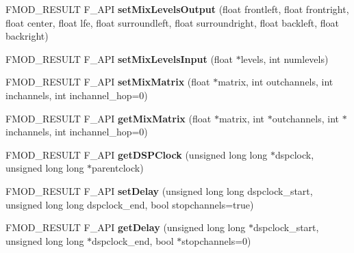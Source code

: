 \begin{DoxyCompactItemize}
\item 
\hypertarget{class_f_m_o_d_1_1_channel_control_a8115b7a7663c09a7ba61df05447415c3}{F\+M\+O\+D\+\_\+\+R\+E\+S\+U\+L\+T F\+\_\+\+A\+P\+I {\bfseries set\+Mix\+Levels\+Output} (float frontleft, float frontright, float center, float lfe, float surroundleft, float surroundright, float backleft, float backright)}\label{class_f_m_o_d_1_1_channel_control_a8115b7a7663c09a7ba61df05447415c3}

\item 
\hypertarget{class_f_m_o_d_1_1_channel_control_a571656bedf6f122615436666005accae}{F\+M\+O\+D\+\_\+\+R\+E\+S\+U\+L\+T F\+\_\+\+A\+P\+I {\bfseries set\+Mix\+Levels\+Input} (float $\ast$levels, int numlevels)}\label{class_f_m_o_d_1_1_channel_control_a571656bedf6f122615436666005accae}

\item 
\hypertarget{class_f_m_o_d_1_1_channel_control_aa88ea962affd54cda96e37fd3a7e2f5a}{F\+M\+O\+D\+\_\+\+R\+E\+S\+U\+L\+T F\+\_\+\+A\+P\+I {\bfseries set\+Mix\+Matrix} (float $\ast$matrix, int outchannels, int inchannels, int inchannel\+\_\+hop=0)}\label{class_f_m_o_d_1_1_channel_control_aa88ea962affd54cda96e37fd3a7e2f5a}

\item 
\hypertarget{class_f_m_o_d_1_1_channel_control_ab24ab6339a35f3028f4fb6e6fd5c134f}{F\+M\+O\+D\+\_\+\+R\+E\+S\+U\+L\+T F\+\_\+\+A\+P\+I {\bfseries get\+Mix\+Matrix} (float $\ast$matrix, int $\ast$outchannels, int $\ast$inchannels, int inchannel\+\_\+hop=0)}\label{class_f_m_o_d_1_1_channel_control_ab24ab6339a35f3028f4fb6e6fd5c134f}

\item 
\hypertarget{class_f_m_o_d_1_1_channel_control_abcfbd62a35db285c30e02299469777fc}{F\+M\+O\+D\+\_\+\+R\+E\+S\+U\+L\+T F\+\_\+\+A\+P\+I {\bfseries get\+D\+S\+P\+Clock} (unsigned long long $\ast$dspclock, unsigned long long $\ast$parentclock)}\label{class_f_m_o_d_1_1_channel_control_abcfbd62a35db285c30e02299469777fc}

\item 
\hypertarget{class_f_m_o_d_1_1_channel_control_a7775d96c75cc964c994fd2e47c96bebc}{F\+M\+O\+D\+\_\+\+R\+E\+S\+U\+L\+T F\+\_\+\+A\+P\+I {\bfseries set\+Delay} (unsigned long long dspclock\+\_\+start, unsigned long long dspclock\+\_\+end, bool stopchannels=true)}\label{class_f_m_o_d_1_1_channel_control_a7775d96c75cc964c994fd2e47c96bebc}

\item 
\hypertarget{class_f_m_o_d_1_1_channel_control_aea1bf9dd5a77d52029984a21ca3eae3b}{F\+M\+O\+D\+\_\+\+R\+E\+S\+U\+L\+T F\+\_\+\+A\+P\+I {\bfseries get\+Delay} (unsigned long long $\ast$dspclock\+\_\+start, unsigned long long $\ast$dspclock\+\_\+end, bool $\ast$stopchannels=0)}\label{class_f_m_o_d_1_1_channel_control_aea1bf9dd5a77d52029984a21ca3eae3b}


\end{DoxyCompactItemize}
